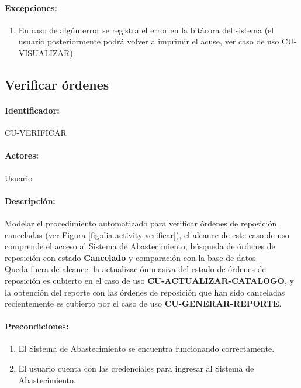 \paragraph{Excepciones:}
\begin{enumerate}
  \item En caso de algún error se registra el error en la bitácora del sistema (el usuario posteriormente podrá volver a imprimir el acuse, ver caso de uso CU-VISUALIZAR).
\end{enumerate}


\subsection{Verificar órdenes}\label{cu-verificar}
\paragraph{Identificador:}
CU-VERIFICAR
\paragraph{Actores:}
Usuario
\paragraph{Descripción:}
Modelar el procedimiento automatizado para verificar órdenes de reposición canceladas (ver Figura \ref{fig:dia-activity-verificar}), el alcance de este caso de uso comprende el acceso al Sistema de Abastecimiento, búsqueda de órdenes de reposición con estado \textbf{Cancelado} y comparación con la base de datos.\\
Queda fuera de alcance: la actualización masiva del estado de órdenes de reposición es cubierto en el caso de uso \textbf{CU-ACTUALIZAR-CATALOGO}, y la obtención del reporte con las órdenes de reposición que han sido canceladas recientemente es cubierto por el caso de uso \textbf{CU-GENERAR-REPORTE}.
\paragraph{Precondiciones:}
\begin{enumerate}
  \item El Sistema de Abastecimiento se encuentra funcionando correctamente.
  \item El usuario cuenta con las credenciales para ingresar al Sistema de Abastecimiento.
\end{enumerate}
